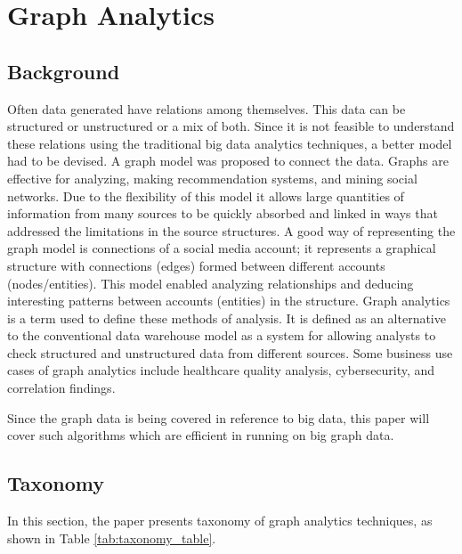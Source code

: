 \documentclass[journal,twoside,web]{ieeecolor}
\begin{document}
\section{Graph Analytics}
\label{sec:background}
\subsection{Background}
Often data generated have relations among themselves. This data can be structured or unstructured or a mix of both. Since it is not feasible to understand these relations using the traditional big data analytics techniques, a better model had to be devised. A graph model was proposed to connect the data. Graphs are effective for analyzing, making recommendation systems, and mining social networks. Due to the flexibility of this model it allows large quantities of information from many sources to be quickly absorbed and linked in ways that addressed the limitations in the source structures. A good way of representing the graph model is connections of a social media account; it represents a graphical structure with connections (edges) formed between different accounts (nodes/entities). This model enabled analyzing relationships and deducing interesting patterns between accounts (entities) in the structure. Graph analytics is a term used to define these methods of analysis. It is defined as an alternative to the conventional data warehouse model as a system for allowing analysts to check structured and unstructured data from different sources. Some business use cases of graph analytics include healthcare quality analysis, cybersecurity, and correlation findings.

Since the graph data is being covered in reference to big data, this paper will cover such algorithms which are efficient in running on big graph data.

\subsection{Taxonomy}
In this section, the paper presents taxonomy of graph analytics techniques, as shown in Table \ref{tab:taxonomy_table}.


\end{document}
